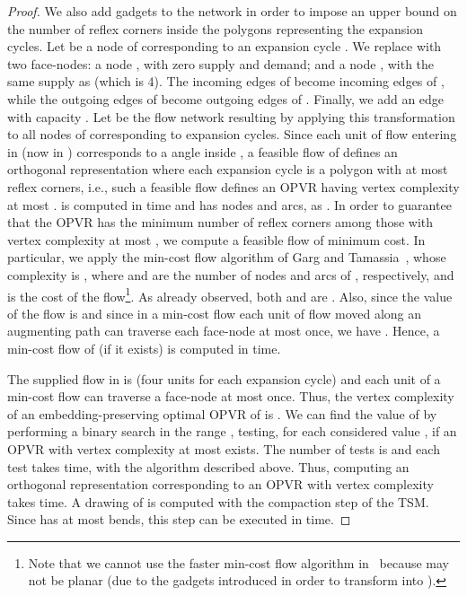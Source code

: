 \documentclass{article}
\newcommand{\opvr}{OPVR\xspace}
\begin{document}
\begin{proof}
We also add gadgets to the network  in order to impose an upper bound  on the number of reflex corners inside the polygons representing the expansion cycles. Let  be a node of  corresponding to an expansion cycle . We replace  with two face-nodes: a node , with zero supply and demand; and a node , with the same supply as  (which is 4). The incoming edges of  become incoming edges of , while the outgoing edges of  become outgoing edges of . Finally, we add an edge  with capacity . Let  be the flow network resulting by applying this transformation to all nodes of  corresponding to expansion cycles. Since each unit of flow entering in  (now in ) corresponds to a  angle inside , a feasible flow of  defines an orthogonal representation where each expansion cycle is a polygon with at most  reflex corners, i.e., such a feasible flow defines an \opvr having vertex complexity at most .  is computed in  time and has  nodes and arcs, as . In order to guarantee that the \opvr has the minimum number of reflex corners among those with vertex complexity at most , we compute a feasible flow of minimum cost. In particular, we apply the min-cost flow algorithm of Garg and Tamassia~\cite{Garg1997}, whose complexity is , where  and  are the number of nodes and arcs of , respectively, and  is the cost of the flow\footnote{Note that we cannot use the faster min-cost flow algorithm in~\cite{DBLP:journals/jgaa/CornelsenK12} because  may not be planar (due to the gadgets introduced in order to transform  into ).}. As already observed, both  and  are . Also, since the value of the flow is  and since in a min-cost flow each unit of flow moved along an augmenting path can traverse each face-node at most once, we have . Hence, a min-cost flow of  (if it exists) is computed in  time. 

The supplied flow in  is  (four units for each expansion cycle) and each unit of a min-cost flow can traverse a face-node at most once. Thus, the vertex complexity of an embedding-preserving optimal \opvr of  is . We can find the value of  by performing a binary search in the range , testing, for each considered value , if an \opvr with vertex complexity at most  exists. The number of tests is  and each test takes  time, with the algorithm described above. Thus, computing an orthogonal representation  corresponding to an \opvr with vertex complexity  takes  time. A drawing of  is computed with the compaction step of the TSM. Since  has at most  bends, this step can be executed in  time.
\end{proof}
\end{document}
